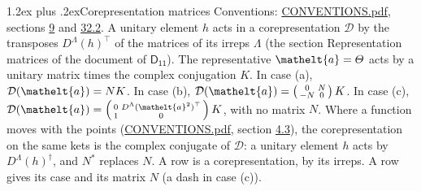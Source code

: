 \documentclass[10pt,a4paper]{article}
\makeatletter
\renewcommand\section{\@startsection{section}{1}{\z@}{-3ex plus -1ex minus -.2ex}%
  {1.2ex plus .2ex}{\normalfont\large\sffamily\bfseries\color{parttitle}}}
\numberwithin{equation}{section}
\newcommand{\eltfont}[1]{{\let\sigma\eltsigma\mathelt{#1}}}
\newcommand{\grp}[1]{\mathsf{#1}}
\newcommand{\elt}[1]{\eltfont{#1}}
\makeatother
\begin{document}
\section{Corepresentation matrices}\label{s:corep_matrices}
Conventions: \href{../../CONVENTIONS.pdf}{CONVENTIONS.pdf}, sections \href{../../../rotation/CONVENTIONS.pdf\#conv.9}{9} and \href{../../CONVENTIONS.pdf\#conv.32.2}{32.2}.
A unitary element $h$ acts in a corepresentation $\mathcal{D}$ by the transposes $D^{\Lambda}(h)^{\top}$ of the matrices of its irreps $\Lambda$ (the section Representation matrices of the document of \href{../../../rotation/data/pdf/D11.pdf}{$\grp{D_{11}}$}). The representative $\elt{a} = \varTheta$ acts by a unitary matrix times the complex conjugation $K$.
In case (a), $\mathcal{D}(\elt{a}) = NK$. In case (b), $\mathcal{D}(\elt{a}) = \left(\begin{smallmatrix} 0 & N \\ -N & 0 \end{smallmatrix}\right) K$. In case (c), $\mathcal{D}(\elt{a}) = \left(\begin{smallmatrix} 0 & D^{\Lambda}(\elt{a}^2)^{\top} \\ 1 & 0 \end{smallmatrix}\right) K$, with no matrix $N$.
Where a function moves with the points (\href{../../CONVENTIONS.pdf}{CONVENTIONS.pdf}, section \href{../../../rotation/CONVENTIONS.pdf\#conv.4.3}{4.3}), the corepresentation on the same kets is the complex conjugate of $\mathcal{D}$: a unitary element $h$ acts by $D^{\Lambda}(h)^{\dagger}$, and $N^{*}$ replaces $N$.
A row is a corepresentation, by its irreps. A row gives its case and its matrix $N$ (a dash in case (c)).
\end{document}
